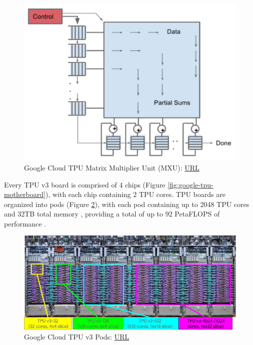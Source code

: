 \begin{figure} [H]
	\centering
	\includegraphics[scale=0.25]{Images/Hardware/tpu-mxu.png}
	\decoRule
	\caption[Google Cloud TPU Matrix Multiplier Unit (MXU)]{Google Cloud TPU Matrix Multiplier Unit (MXU): \href{https://cloud.google.com/blog/products/gcp/an-in-depth-look-at-googles-first-tensor-processing-unit-tpu}{URL}}
	\label{fig:tpu-mxu}
\end{figure}

Every TPU v3 board is comprised of 4 chips (Figure \ref{fig:google-tpu-motherboard}), with each chip containing 2 TPU cores. TPU boards are organized into pods (Figure \ref{fig:tpu-v3-pods}), with each pod containing up to 2048 TPU cores and 32TB total memory \cite{Google-Cloud-TPU}, providing a total of up to 92 PetaFLOPS of performance \cite{Tensor-Processing-Unit-Wikipedia}.

\begin{figure} [H]
	\centering
	\includegraphics[width=\textwidth]{Images/Hardware/tpu-v3-pods.png}
	\decoRule
	\caption[Google Cloud TPU v3 Pods]{Google Cloud TPU v3 Pods: \href{https://cloud.google.com/tpu/docs/system-architecture}{URL}}
	\label{fig:tpu-v3-pods}
\end{figure}

